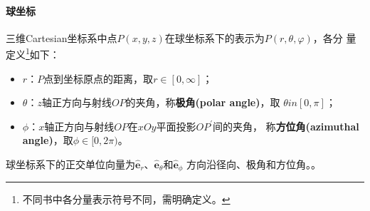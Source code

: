 \paragraph*{球坐标}
三维Cartesian坐标系中点$P(x, y, z)$在球坐标系下的表示为$P(r, \theta, \varphi)$，各分
量定义\footnote{不同书中各分量表示符号不同，需明确定义。}如下：
\begin{itemize}
    \item $r$：$P$点到坐标原点的距离，取$r \in [0, \infty]$；
    \item $\theta$：$z$轴正方向与射线$OP$的夹角，称\textbf{极角(polar angle)}，取
                    $\theta in [0, \pi]$；
    \item $\phi$：$x$轴正方向与射线$OP$在$xOy$平面投影$OP^{\prime}$间的夹角，
                  称\textbf{方位角(azimuthal angle)}，取$\phi \in [0, 2\pi)$。
\end{itemize}
球坐标系下的正交单位向量为$\hat{\bm{e}}_r$、$\hat{\bm{e}}_\theta$和$\hat{\bm{e}}_\phi$
方向沿径向、极角和方位角。。
